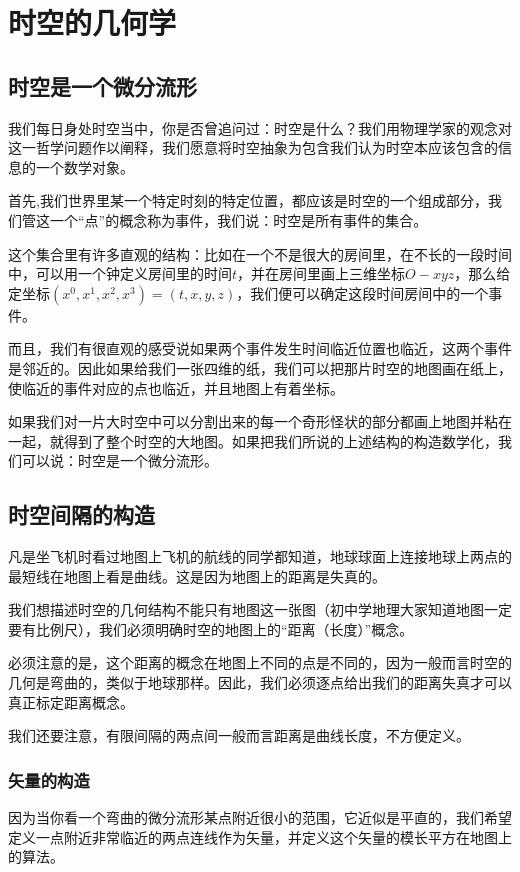 \documentclass{article}
\begin{document}
\section{时空的几何学}
\subsection{时空是一个微分流形}
我们每日身处时空当中，你是否曾追问过：时空是什么？我们用物理学家的观念对这一哲学问题作以阐释，我们愿意将时空抽象为包含我们认为时空本应该包含的信息的一个数学对象。

首先,我们世界里某一个特定时刻的特定位置，都应该是时空的一个组成部分，我们管这一个“点”的概念称为事件，我们说：时空是所有事件的集合。

这个集合里有许多直观的结构：比如在一个不是很大的房间里，在不长的一段时间中，可以用一个钟定义房间里的时间$t$，并在房间里画上三维坐标$O-xyz$，那么给定坐标$(x^0,x^1,x^2,x^3)=(t,x,y,z)$，我们便可以确定这段时间房间中的一个事件。

而且，我们有很直观的感受说如果两个事件发生时间临近位置也临近，这两个事件是邻近的。因此如果给我们一张四维的纸，我们可以把那片时空的地图画在纸上，使临近的事件对应的点也临近，并且地图上有着坐标。

如果我们对一片大时空中可以分割出来的每一个奇形怪状的部分都画上地图并粘在一起，就得到了整个时空的大地图。如果把我们所说的上述结构的构造数学化，我们可以说：时空是一个微分流形。

\subsection{时空间隔的构造}
凡是坐飞机时看过地图上飞机的航线的同学都知道，地球球面上连接地球上两点的最短线在地图上看是曲线。这是因为地图上的距离是失真的。

我们想描述时空的几何结构不能只有地图这一张图（初中学地理大家知道地图一定要有比例尺），我们必须明确时空的地图上的“距离（长度）”概念。

必须注意的是，这个距离的概念在地图上不同的点是不同的，因为一般而言时空的几何是弯曲的，类似于地球那样。因此，我们必须逐点给出我们的距离失真才可以真正标定距离概念。

我们还要注意，有限间隔的两点间一般而言距离是曲线长度，不方便定义。

\subsubsection{矢量的构造}
因为当你看一个弯曲的微分流形某点附近很小的范围，它近似是平直的，我们希望定义一点附近非常临近的两点连线作为矢量，并定义这个矢量的模长平方在地图上的算法。
\end{document}
